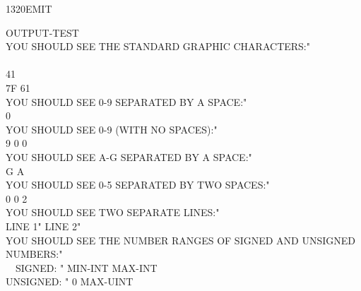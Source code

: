 \begin{worddef}{1320}{EMIT}
	\begin{testing} %
		\ttfamily
		\word{:} OUTPUT-TEST \\[1ex]
		\tab   {} YOU SHOULD SEE THE STANDARD GRAPHIC CHARACTERS:"  \\
		       \\
		 41      \\
		\tab   7F 61      \\[1ex]
		\tab   {} YOU SHOULD SEE 0-9 SEPARATED BY A SPACE:"  \\
		  0      \\[1ex]
		\tab   {} YOU SHOULD SEE 0-9 (WITH NO SPACES):"  \\
		\tab   \word{[CHAR]} 9  \word{[CHAR]} 0
			  0     \\[1ex]
		\tab   {} YOU SHOULD SEE A-G SEPARATED BY A SPACE:"  \\
		\tab   \word{[CHAR]} G  \word{[CHAR]} A
			      \\[1ex]
		\tab   {} YOU SHOULD SEE 0-5 SEPARATED BY TWO SPACES:"  \\
		  0
			  \word{[CHAR]} 0 \word{+}  2    \\[1ex]
		\tab   {} YOU SHOULD SEE TWO SEPARATE LINES:"  \\
		\tab   {} LINE 1"    LINE 2"   \\[1ex]
		\tab   {} {\small YOU SHOULD SEE THE NUMBER RANGES OF SIGNED AND UNSIGNED NUMBERS:}"  \\
		\tab   {} ~~SIGNED: " MIN-INT  MAX-INT   \\
		\tab   {} UNSIGNED: " 0  MAX-UINT   \\
		\word{;}

	\end{testing}
\end{worddef}


